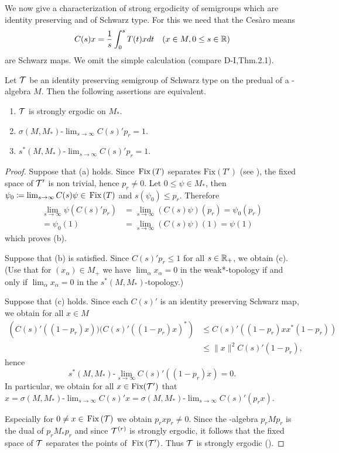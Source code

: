 We now give a characterization of strong ergodicity of semigroups which are identity preserving and of Schwarz type.
For this we need that the Cesàro means
\[
C(s)x = \frac{1}{s}\int_{0}^{s} T(t)xdt \quad (x \in M, 0 \leq s \in \mathbb{R})
\]
are Schwarz maps.
We omit the simple calculation (compare D-I,Thm.2.1).
\begin{proposition}\label{prop:d4-3.3}
Let $\mathcal{T}$ be an identity preserving semigroup of Schwarz type on the predual of a \WA-algebra $M$.
Then the following assertions are equivalent.
\begin{enumerate}[\upshape (a)]
\item
$\mathcal{T}$ is strongly ergodic on $M_{*}$.

\item
$\sigma(M,M_{*})\text{-}\lim_{s \to \infty} C(s)'p_{r} = 1$.

\item
$s^{*}(M,M_{*})\text{-}\lim_{s \to \infty} C(s)'p_{r} = 1$.
\end{enumerate}
\end{proposition}
\begin{proof}
Suppose that (a) holds.
Since $\mathop{}\mathrm{Fix}\left(T\right)$ separates $\text{Fix}(T')$ (see \citet[Chap.2,Thm.1.4]{krengel:1985}), the fixed space of $\mathcal{T}'$ is non trivial, hence $p_{r} \neq 0$.
Let $0 \leq \psi \in M_{*}$, then $\psi_{0} \coloneqq \lim_{s \to \infty} C(s)\psi \in \mathop{}\mathrm{Fix}\left(T\right)$ and $s(\psi_{0}) \leq p_{r}$.
Therefore
\begin{align*}
\lim_{s \to \infty} \psi(C(s)'p_{r}) &= \lim_{s \to \infty} (C(s)\psi)(p_{r})  = \psi_{0}(p_{r})  \\
= \psi_{0}(1) &= \lim_{s \to \infty} (C(s)\psi)(1) = \psi(1)
\end{align*}
which proves (b).

Suppose that (b) is satisfied.
Since $C(s)'p_{r} \leq 1$ for all $s \in \mathbb{R}_{+}$, we obtain (c).
(Use that for $(x_{\alpha}) \in M_{+}$ we have $\lim_{\alpha}x_{\alpha} = 0$ in the weak*-topology if and only if $\lim_{\alpha}x_{\alpha} = 0$ in the $s^{*}(M,M_{*})$-topology.)

Suppose that (c) holds.
Since each $C(s)'$ is an identity preserving Schwarz map, we obtain for all $x \in M$
\begin{align*}
	\left( C(s)'((1-p_{r})x))(C(s)'((1-p_{r})x)^{*} \right) 
			&\leq C(s)'((1-p_{r})xx^{*}(1-p_{r}))  \\
 	&\leq \|x\|^2 C(s)'(1-p_{r}),
\end{align*}
hence
\[
s^{*}(M,M_{*})\text{-}\lim_{s \to \infty} C(s)'((1-p_{r})x) = 0.
\]
In particular, we obtain for all $x \in \text{Fix}(\mathcal{T}')$ that $x = \sigma(M,M_{*})\text{-}\lim_{s \to \infty} C(s)'x = \sigma(M,M_{*})\text{-}\lim_{s \to \infty} C(s)'(p_{r}x)$.

Especially for $0 \neq x \in \mathop{}\mathrm{Fix}\left(\mathcal{T}\right)$ we obtain $p_{r}xp_{r} \neq 0$.
Since the \WA-algebra $p_{r}Mp_{r}$ is the dual of $p_{r}M_{*}p_{r}$ and since $\mathcal{T}^{(r)}$ is strongly ergodic, it follows that the fixed space of\/ $\mathcal{T}$ separates the points of $\mathop{}\mathrm{Fix}\left(\mathcal{T}'\right)$.
Thus $\mathcal{T}$ is strongly ergodic (\citet[Chap. 2, Thm. 1.4]{krengel:1985}).
\end{proof}
